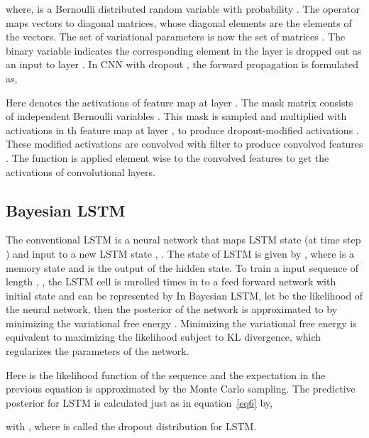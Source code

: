 \documentclass[review]{elsarticle}
\begin{document}
where,  is a Bernoulli distributed random variable with probability . The  operator maps vectors to diagonal matrices, whose diagonal elements are the elements of the vectors. The set of variational parameters  is now the set of matrices . The binary variable  indicates the corresponding element  in the layer  is dropped out as an input to layer . In CNN with dropout \cite{Wu_NN2015}, the forward propagation is formulated as,

Here  denotes the activations of feature map   at layer . The mask matrix  consists of independent Bernoulli variables . This mask is sampled and multiplied with activations in th feature map at layer , to produce dropout-modified activations . These modified activations are convolved with filter  to produce convolved features . The function  is applied element wise to the convolved features to get the activations of convolutional layers.



\subsection{Bayesian LSTM}
The conventional LSTM is a neural network that maps LSTM state  (at time step ) and input  to a new LSTM state , . The state of LSTM is given by , where  is a memory state and  is the output of the hidden state. To train a input sequence of length , , the LSTM cell is unrolled  times in to a feed forward network with initial state  and can be represented by 
In Bayesian LSTM, let  be the likelihood of the neural network, then the posterior of the network is approximated to  by minimizing the variational free energy \cite{Gal_NIPS2016,Fortunato_Arxiv2017}.
Minimizing the variational free energy is equivalent to maximizing the likelihood   subject to KL divergence, which regularizes the parameters of the network.


Here  is the likelihood function of the sequence and the expectation in the previous equation is approximated by the Monte Carlo sampling. The predictive posterior for LSTM is calculated just as in equation~\ref{eq6} by, 

with , where  is called the dropout distribution for LSTM.
\end{document}
